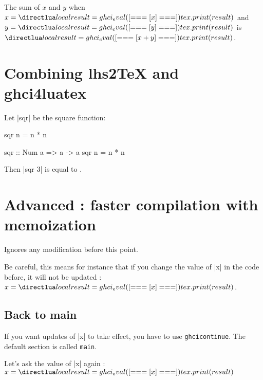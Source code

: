 \documentclass{article}
\begin{document}

The sum of $x$ and $y$ when $x = \hask{x}$ and $y = \hask{y}$ is $\hask{x + y}$.

\section{Combining lhs2TeX and ghci4luatex}


Let |sqr| be the square function:

\begin{code}
sqr n = n * n
\end{code}

\begin{ghci}
  sqr :: Num a => a -> a
  sqr n = n * n
\end{ghci}

Then  |sqr 3| is equal to .


\section{Advanced : faster compilation with memoization}


Ignores any modification before this point.

Be careful, this means for instance that if you change the value of |x| in the code before, it will not be updated : $x = \hask{x}$.


\subsection{Back to main}
If you  want updates of |x| to take effect, you have to use \texttt{ghcicontinue}. The default section is called \texttt{main}.

Let's ask the value of |x| again : $x = \hask{x}$
\end{document}
